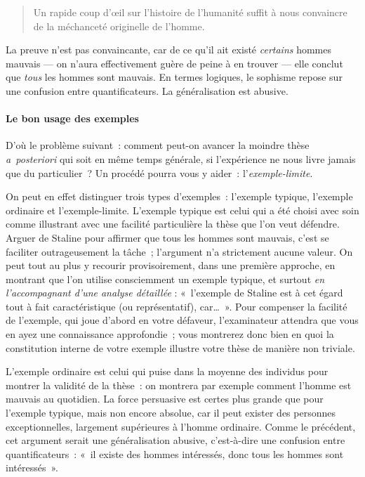 \documentclass[a4paper]{article}
\begin{document}
\begin{quote}
Un rapide coup d'œil sur l'histoire de l'humanité suffit à nous
convaincre de la méchanceté originelle de l'homme.
\end{quote}

   
   La preuve n'est pas convaincante, car de ce qu'il ait existé
   \emph{certains} hommes mauvais --- on n'aura effectivement guère de peine
   à en trouver --- elle conclut que \emph{tous} les hommes sont mauvais. En
   termes logiques, le sophisme repose sur une confusion entre
   quantificateurs. La généralisation est abusive.
\paragraph{Le bon usage des exemples}
\label{sec-3-3-2-3}

   
   D'où le problème suivant : comment peut-on avancer la moindre thèse
   \emph{a posteriori} qui soit en même temps générale, si l'expérience ne
   nous livre jamais que du particulier ? Un procédé pourra vous y
   aider : l'\emph{exemple-limite}.
   
   On peut en effet distinguer trois types d'exemples : l'exemple
   typique, l'exemple ordinaire et l'exemple-limite. L'exemple typique
   est celui qui a été choisi avec soin comme illustrant avec une
   facilité particulière la thèse que l'on veut défendre. Arguer de
   Staline pour affirmer que tous les hommes sont mauvais, c'est se
   faciliter outrageusement la tâche ; l'argument n'a strictement aucune
   valeur. On peut tout au plus y recourir provisoirement, dans une
   première approche, en montrant que l'on utilise consciemment un
   exemple typique, et surtout \emph{en l'accompagnant d'une analyse    détaillée} : « l'exemple de Staline est à cet égard tout à fait
   caractéristique (ou représentatif), car\ldots{} ». Pour compenser la
   facilité de l'exemple, qui joue d'abord en votre défaveur,
   l'examinateur attendra que vous en ayez une connaissance
   approfondie ; vous montrerez donc bien en quoi la constitution
   interne de votre exemple illustre votre thèse de manière non
   triviale.
   
   L'exemple ordinaire est celui qui puise dans la moyenne des individus
   pour montrer la validité de la thèse : on montrera par exemple
   comment l'homme est mauvais au quotidien. La force persuasive est
   certes plus grande que pour l'exemple typique, mais non encore
   absolue, car il peut exister des personnes exceptionnelles, largement
   supérieures à l'homme ordinaire. Comme le précédent, cet argument
   serait une généralisation abusive, c'est-à-dire une confusion entre
   quantificateurs : « il existe des hommes intéressés, donc tous les
   hommes sont intéressés ».
   
\end{document}
